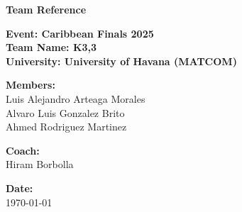 \documentclass{article}
\begin{document}
\begin{landscape}
\begin{titlepage}
    \centering
    \vspace*{1in}
    
    \Huge
    \textbf{Team Reference}
    
    \vspace{0.5in}
    \LARGE
    \textbf{Event: Caribbean Finals 2025} \\
    [0.5cm]
    \textbf{Team Name: K3,3} \\
    [0.5cm]
    \textbf{University: University of Havana (MATCOM)} \\
    
    \vfill
    
    \Large
    \textbf{Members:} \\
    Luis Alejandro Arteaga Morales \\
    Alvaro Luis Gonzalez Brito \\
    Ahmed Rodriguez Martinez \\
    
    \vspace{0.5in}
    
    \textbf{Coach:} \\
    Hiram Borbolla \\
    
    \vfill
    
    \vspace{0.5in}
    
    \Large
    \textbf{Date:} \\
    \today
    
\end{titlepage}

\newpage

\tableofcontents

\newpage

\setlength{\columnseprule}{0.4pt}
\begin{multicols}{2}

\end{multicols}

\end{landscape}
\end{document}
